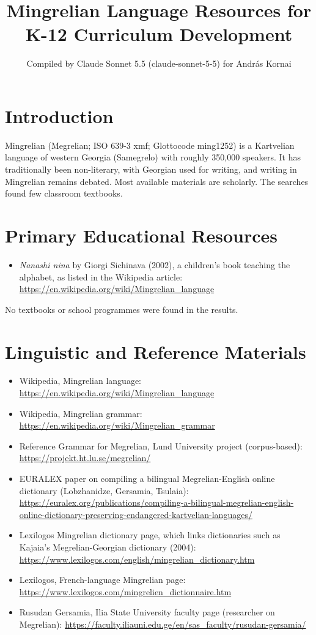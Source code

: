 \documentclass[12pt]{article}
\title{Mingrelian Language Resources for K-12 Curriculum Development}
\author{Compiled by Claude Sonnet 5.5 (claude-sonnet-5-5) for Andr\'as Kornai}
\date{}
\begin{document}
\maketitle

\section{Introduction}
Mingrelian (Megrelian; ISO 639-3 xmf; Glottocode ming1252) is a Kartvelian language of western Georgia (Samegrelo) with roughly 350,000 speakers. It has traditionally been non-literary, with Georgian used for writing, and writing in Mingrelian remains debated. Most available materials are scholarly. The searches found few classroom textbooks.

\section{Primary Educational Resources}
\begin{itemize}
\item \emph{Nanashi nina} by Giorgi Sichinava (2002), a children's book teaching the alphabet, as listed in the Wikipedia article: \url{https://en.wikipedia.org/wiki/Mingrelian_language}
\end{itemize}
No textbooks or school programmes were found in the results.

\section{Linguistic and Reference Materials}
\begin{itemize}
\item Wikipedia, Mingrelian language: \url{https://en.wikipedia.org/wiki/Mingrelian_language}
\item Wikipedia, Mingrelian grammar: \url{https://en.wikipedia.org/wiki/Mingrelian_grammar}
\item Reference Grammar for Megrelian, Lund University project (corpus-based): \url{https://projekt.ht.lu.se/megrelian/}
\item EURALEX paper on compiling a bilingual Megrelian-English online dictionary (Lobzhanidze, Gersamia, Tsulaia): \url{https://euralex.org/publications/compiling-a-bilingual-megrelian-english-online-dictionary-preserving-endangered-kartvelian-languages/}
\item Lexilogos Mingrelian dictionary page, which links dictionaries such as Kajaia's Megrelian-Georgian dictionary (2004): \url{https://www.lexilogos.com/english/mingrelian_dictionary.htm}
\item Lexilogos, French-language Mingrelian page: \url{https://www.lexilogos.com/mingrelien_dictionnaire.htm}
\item Rusudan Gersamia, Ilia State University faculty page (researcher on Megrelian): \url{https://faculty.iliauni.edu.ge/en/sas_faculty/rusudan-gersamia/}
\end{itemize}
\end{document}
